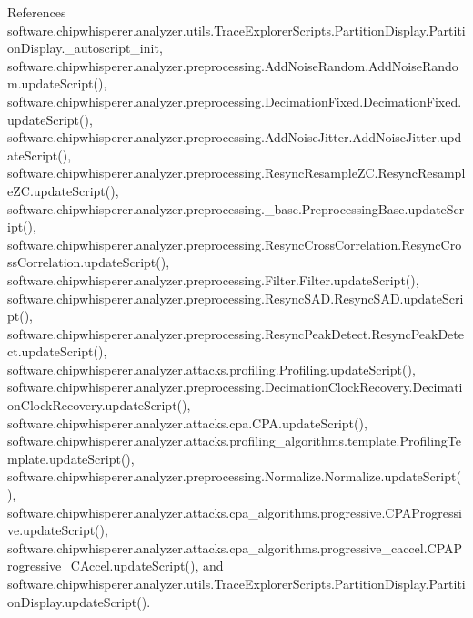 References software.\+chipwhisperer.\+analyzer.\+utils.\+Trace\+Explorer\+Scripts.\+Partition\+Display.\+Partition\+Display.\+\_\+autoscript\+\_\+init, software.\+chipwhisperer.\+analyzer.\+preprocessing.\+Add\+Noise\+Random.\+Add\+Noise\+Random.\+update\+Script(), software.\+chipwhisperer.\+analyzer.\+preprocessing.\+Decimation\+Fixed.\+Decimation\+Fixed.\+update\+Script(), software.\+chipwhisperer.\+analyzer.\+preprocessing.\+Add\+Noise\+Jitter.\+Add\+Noise\+Jitter.\+update\+Script(), software.\+chipwhisperer.\+analyzer.\+preprocessing.\+Resync\+Resample\+Z\+C.\+Resync\+Resample\+Z\+C.\+update\+Script(), software.\+chipwhisperer.\+analyzer.\+preprocessing.\+\_\+base.\+Preprocessing\+Base.\+update\+Script(), software.\+chipwhisperer.\+analyzer.\+preprocessing.\+Resync\+Cross\+Correlation.\+Resync\+Cross\+Correlation.\+update\+Script(), software.\+chipwhisperer.\+analyzer.\+preprocessing.\+Filter.\+Filter.\+update\+Script(), software.\+chipwhisperer.\+analyzer.\+preprocessing.\+Resync\+S\+A\+D.\+Resync\+S\+A\+D.\+update\+Script(), software.\+chipwhisperer.\+analyzer.\+preprocessing.\+Resync\+Peak\+Detect.\+Resync\+Peak\+Detect.\+update\+Script(), software.\+chipwhisperer.\+analyzer.\+attacks.\+profiling.\+Profiling.\+update\+Script(), software.\+chipwhisperer.\+analyzer.\+preprocessing.\+Decimation\+Clock\+Recovery.\+Decimation\+Clock\+Recovery.\+update\+Script(), software.\+chipwhisperer.\+analyzer.\+attacks.\+cpa.\+C\+P\+A.\+update\+Script(), software.\+chipwhisperer.\+analyzer.\+attacks.\+profiling\+\_\+algorithms.\+template.\+Profiling\+Template.\+update\+Script(), software.\+chipwhisperer.\+analyzer.\+preprocessing.\+Normalize.\+Normalize.\+update\+Script(), software.\+chipwhisperer.\+analyzer.\+attacks.\+cpa\+\_\+algorithms.\+progressive.\+C\+P\+A\+Progressive.\+update\+Script(), software.\+chipwhisperer.\+analyzer.\+attacks.\+cpa\+\_\+algorithms.\+progressive\+\_\+caccel.\+C\+P\+A\+Progressive\+\_\+\+C\+Accel.\+update\+Script(), and software.\+chipwhisperer.\+analyzer.\+utils.\+Trace\+Explorer\+Scripts.\+Partition\+Display.\+Partition\+Display.\+update\+Script().



